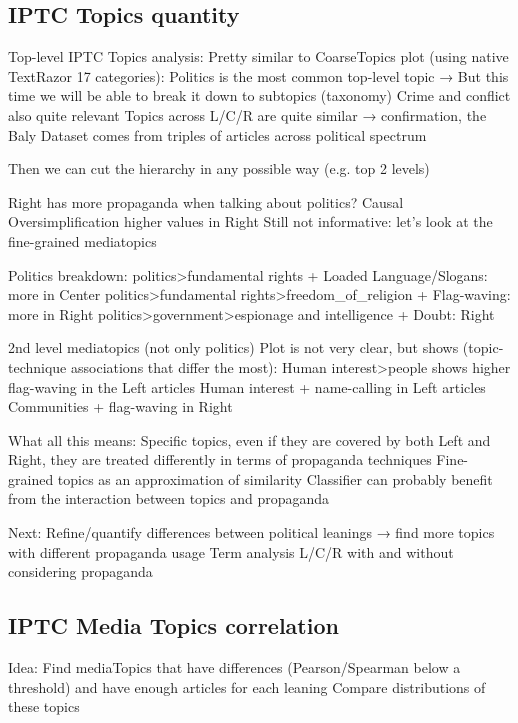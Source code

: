 \subsection{IPTC Topics quantity}

Top-level IPTC Topics analysis:
Pretty similar to CoarseTopics plot (using native TextRazor 17 categories):
Politics is the most common top-level topic → But this time we will be able to break it down to subtopics (taxonomy)
Crime and conflict also quite relevant
Topics across L/C/R are quite similar → confirmation, the Baly Dataset comes from triples of articles across political spectrum

Then we can cut the hierarchy in any possible way (e.g. top 2 levels)

Right has more propaganda when talking about politics?
Causal Oversimplification higher values in Right
Still not informative: let’s look at the fine-grained mediatopics

Politics breakdown:
politics>fundamental rights + Loaded Language/Slogans: more in Center
politics>fundamental rights>freedom\_of\_religion + Flag-waving: more in Right
politics>government>espionage and intelligence + Doubt: Right

2nd level mediatopics (not only politics)
Plot is not very clear, but shows (topic-technique associations that differ the most):
Human interest>people shows higher flag-waving in the Left articles
Human interest + name-calling in Left articles
Communities + flag-waving in Right

What all this means:
Specific topics, even if they are covered by both Left and Right, they are treated differently in terms of propaganda techniques
Fine-grained topics as an approximation of similarity
Classifier can probably benefit from the interaction between topics and propaganda

Next:
Refine/quantify differences between political leanings → find more topics with different propaganda usage
Term analysis L/C/R with and without considering propaganda





\subsection{IPTC Media Topics correlation}
Idea:
Find mediaTopics that have differences (Pearson/Spearman below a threshold) and have enough articles for each leaning
Compare distributions of these topics

